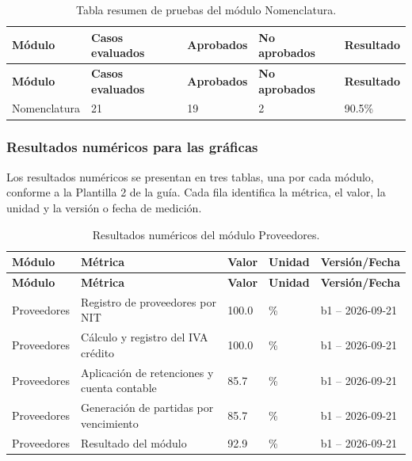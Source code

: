 \begingroup\fontsize{8}{9}\selectfont\setlength{\tabcolsep}{4pt}
\begin{xltabular}{\linewidth}{@{}p{3.0cm}p{2.4cm}p{2.4cm}p{2.4cm}p{2.4cm}@{}}

\caption{Tabla resumen de pruebas del módulo Nomenclatura.}\label{tab:cap4_resumen_nomenclatura}\\
\toprule
\textbf{Módulo} & \textbf{Casos evaluados} & \textbf{Aprobados} & \textbf{No aprobados} & \textbf{Resultado}\\
\midrule
\endfirsthead
\toprule
\textbf{Módulo} & \textbf{Casos evaluados} & \textbf{Aprobados} & \textbf{No aprobados} & \textbf{Resultado}\\
\midrule
\endhead
\endfoot
\bottomrule
\endlastfoot

Nomenclatura & 21 & 19 & 2 & 90.5\%\\

\bottomrule
\end{xltabular}
\endgroup

\subsubsection{Resultados numéricos para las gráficas}

Los resultados numéricos se presentan en tres tablas, una por cada módulo, conforme a la Plantilla 2 de la guía. Cada fila identifica la métrica, el valor, la unidad y la versión o fecha de medición.

\begingroup\fontsize{8}{9}\selectfont\setlength{\tabcolsep}{3pt}
\begin{xltabular}{\linewidth}{@{}p{3.0cm}p{5.2cm}p{1.5cm}p{1.5cm}p{3.0cm}@{}}

\caption{Resultados numéricos del módulo Proveedores.}\label{tab:cap4_resultados_proveedores}\\
\toprule
\textbf{Módulo} & \textbf{Métrica} & \textbf{Valor} & \textbf{Unidad} & \textbf{Versión/Fecha}\\
\midrule
\endfirsthead
\toprule
\textbf{Módulo} & \textbf{Métrica} & \textbf{Valor} & \textbf{Unidad} & \textbf{Versión/Fecha}\\
\midrule
\endhead
\endfoot
\bottomrule
\endlastfoot
Proveedores & Registro de proveedores por NIT & 100.0 & \% & b1 -- 2026-09-21\\
Proveedores & Cálculo y registro del IVA crédito & 100.0 & \% & b1 -- 2026-09-21\\
Proveedores & Aplicación de retenciones y cuenta contable & 85.7 & \% & b1 -- 2026-09-21\\
Proveedores & Generación de partidas por vencimiento & 85.7 & \% & b1 -- 2026-09-21\\
Proveedores & Resultado del módulo & 92.9 & \% & b1 -- 2026-09-21\\
\end{xltabular}
\endgroup


